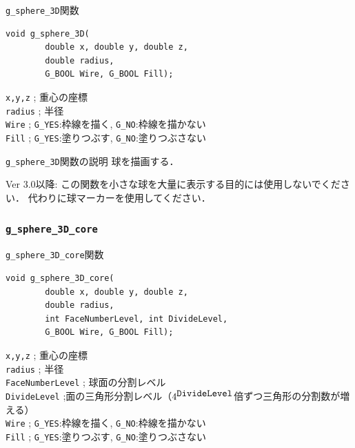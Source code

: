 \documentclass[platex,a4paper,12pt]{jsarticle}%
\begin{document}
\begin{itembox}[l]{\texttt{g\_sphere\_3D}関数}
\begin{verbatim}
void g_sphere_3D(
        double x, double y, double z,
        double radius,
        G_BOOL Wire, G_BOOL Fill);   
\end{verbatim}
\verb|x,y,z| ; 重心の座標\\
\verb|radius| ; 半径\\
\verb|Wire| ; \verb|G_YES|:枠線を描く, \verb|G_NO|:枠線を描かない \\
\verb|Fill| ; \verb|G_YES|:塗りつぶす, \verb|G_NO|:塗りつぶさない
\end{itembox}

\begin{itembox}[l]{\texttt{g\_sphere\_3D}関数の説明}
球を描画する．

Ver 3.0以降: この関数を小さな球を大量に表示する目的には使用しないでください．
代わりに球マーカーを使用してください．
\end{itembox}


\clearpage
\subsubsection{\texttt{g\_sphere\_3D\_core}}

\begin{itembox}[l]{\texttt{g\_sphere\_3D\_core}関数}
\begin{verbatim}
void g_sphere_3D_core(
        double x, double y, double z,
        double radius,
        int FaceNumberLevel, int DivideLevel, 
        G_BOOL Wire, G_BOOL Fill);   
\end{verbatim}
\verb|x,y,z| ; 重心の座標\\
\verb|radius| ; 半径\\
\verb|FaceNumberLevel| ; 球面の分割レベル\\
\verb|DivideLevel| ;面の三角形分割レベル（$4^{\verb|DivideLevel|}$倍ずつ三角形の分割数が増える）\\
\verb|Wire| ; \verb|G_YES|:枠線を描く, \verb|G_NO|:枠線を描かない \\
\verb|Fill| ; \verb|G_YES|:塗りつぶす, \verb|G_NO|:塗りつぶさない
\end{itembox}
\end{document}
